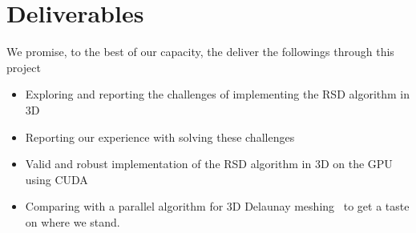 \documentclass[12pt] {article}
\begin{document}
\section*{Deliverables}
We promise, to the best of our capacity, the deliver the followings through this project
\begin{itemize}
\item Exploring and reporting the challenges of implementing the RSD algorithm in 3D
\item Reporting our experience with solving these challenges 
\item Valid and robust implementation of the RSD algorithm in 3D on the GPU using CUDA
\item Comparing with a parallel algorithm for 3D Delaunay meshing~\citep{cao2014gpu} to get a taste on where we stand. 
\end{itemize}




\end{document}
